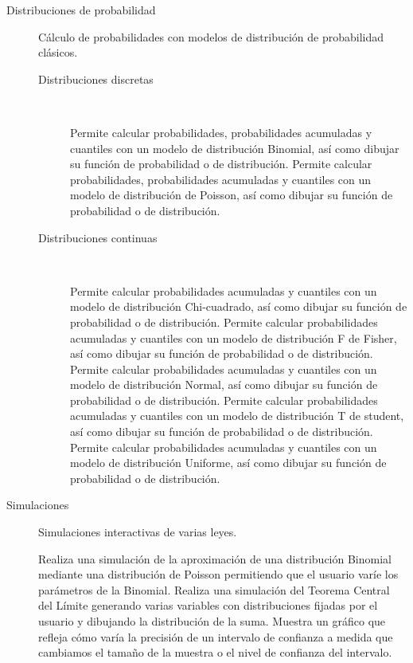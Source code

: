 \documentclass[10pt,twoside,spanish]{article}
\numberwithin{equation}{section}
\begin{document}
\begin{description}
\item[Distribuciones de probabilidad] Cálculo de probabilidades con modelos de distribución de probabilidad clásicos. 
\begin{description}
\item[Distribuciones discretas] \hfill\\[-1\baselineskip] 
\begin{itemize}
 Permite calcular probabilidades, probabilidades acumuladas y cuantiles con un modelo de distribución Binomial, así como
dibujar su función de probabilidad o de distribución.
 Permite calcular probabilidades, probabilidades acumuladas y cuantiles con un modelo de distribución de Poisson, así como
dibujar su función de probabilidad o de distribución.
\end{itemize}
\item[Distribuciones continuas] \hfill\\[-1\baselineskip] 
\begin{itemize} 
 Permite calcular probabilidades acumuladas y cuantiles con un modelo de distribución Chi-cuadrado, así como
dibujar su función de probabilidad o de distribución.
 Permite calcular probabilidades acumuladas y cuantiles con un modelo de distribución F de Fisher, así como
dibujar su función de probabilidad o de distribución.
 Permite calcular probabilidades acumuladas y cuantiles con un modelo de distribución Normal, así como
dibujar su función de probabilidad o de distribución.
 Permite calcular probabilidades acumuladas y cuantiles con un modelo de distribución T de student, así como
dibujar su función de probabilidad o de distribución.
 Permite calcular probabilidades acumuladas y cuantiles con un modelo de distribución Uniforme, así como
dibujar su función de probabilidad o de distribución.
\end{itemize}
\end{description}

\item[Simulaciones] Simulaciones interactivas de varias leyes. 
\begin{itemize}
 Realiza una simulación de la aproximación de una distribución Binomial mediante una
distribución de Poisson permitiendo que el usuario varíe los parámetros de la Binomial. 
 Realiza una simulación del Teorema Central del Límite generando varias variables con
distribuciones fijadas por el usuario y dibujando la distribución de la suma.
 Muestra un gráfico que refleja cómo varía la precisión de un intervalo de confianza a medida
que cambiamos el tamaño de la muestra o el nivel de confianza del intervalo. 
\end{itemize}
\end{description}
\end{document}

